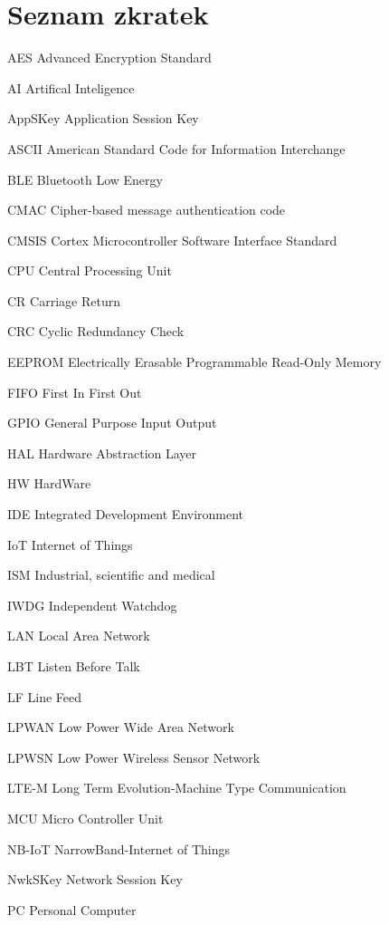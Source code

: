 \documentclass[oneside]{ctuthesis}
\theoremstyle{plain}
\theoremstyle{definition}
\theoremstyle{note}
\newcommand{\abbrlabel}[1]{\makebox[3cm][l]{\textbf{#1}\ \dotfill}}
\newenvironment{abbreviations}{\begin{list}{}{\renewcommand{\makelabel}{\abbrlabel}}}{\end{list}}
\begin{document}
\section{Seznam zkratek}
\begin{abbreviations}
	\item[AES]		Advanced Encryption Standard 
	\item[AI]		Artifical Inteligence
	\item[AppSKey]	Application Session Key	
	\item[ASCII] 	American Standard Code for Information Interchange
	\item[BLE]		Bluetooth Low Energy 
	\item[CMAC]		Cipher-based message authentication code 
	\item[CMSIS]	Cortex Microcontroller Software Interface Standard  
	\item[CPU]		Central Processing Unit
	\item[CR] 		Carriage Return
	\item[CRC] 		Cyclic Redundancy Check
	\item[EEPROM] 	Electrically Erasable Programmable Read-Only Memory
	\item[FIFO]		First In First Out 
	\item[GPIO]		General Purpose Input Output 
	\item[HAL]		Hardware Abstraction Layer 
	\item[HW]		HardWare
	\item[IDE]		Integrated Development Environment 
	\item[IoT] 		Internet of Things
	\item[ISM]		Industrial, scientific and medical 
	\item[IWDG]		Independent Watchdog 
	\item[LAN]		Local Area Network
	\item[LBT]		Listen Before Talk 
	\item[LF]		Line Feed 
	\item[LPWAN]   	Low Power Wide Area Network 
	\item[LPWSN] 	Low Power Wireless Sensor Network	
	\item[LTE-M] 	Long Term Evolution-Machine Type Communication 
	\item[MCU] 		Micro Controller Unit
	\item[NB-IoT] 	NarrowBand-Internet of Things   
	\item[NwkSKey]	Network Session Key
	\item[PC]		Personal Computer 

\end{abbreviations}
\end{document}
